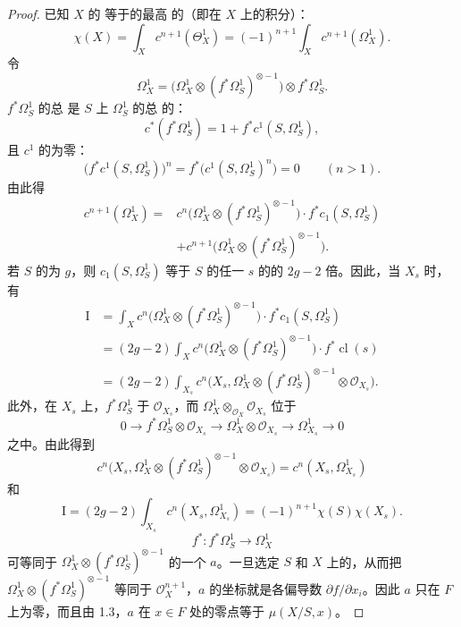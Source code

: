 \begin{proof}
已知 $X$ 的 等于的最高 的（即在 $X$ 上的积分）：
\[
\chi(X)=\int_X c^{n+1}(\Theta^1_X)
=(-1)^{n+1}\int_X c^{n+1}(\Omega^1_X).
\]
令
\[
\Omega^1_X=\bigl(\Omega^1_X\otimes(f^*\Omega^1_S)^{\otimes-1}\bigr)\otimes f^*\Omega^1_S.
\]
 $f^*\Omega^1_S$ 的总 是 $S$ 上 $\Omega^1_S$ 的总 的：
\[
c^*(f^*\Omega^1_S)=1+f^*c^1(S,\Omega^1_S),
\]
且 $c^1$ 的为零：
\[
\bigl(f^*c^1(S,\Omega^1_S)\bigr)^n
=f^*\bigl(c^1(S,\Omega^1_S)^n\bigr)=0\qquad(n>1).
\]
由此得
\[
\begin{aligned}
c^{n+1}(\Omega^1_X)
={}&c^n\bigl(\Omega^1_X\otimes(f^*\Omega^1_S)^{\otimes-1}\bigr)\cdot f^*c_1(S,\Omega^1_S)\\
&+c^{n+1}\bigl(\Omega^1_X\otimes(f^*\Omega^1_S)^{\otimes-1}\bigr).
\end{aligned}
\]
若 $S$ 的为 $g$，则 $c_1(S,\Omega^1_S)$ 等于 $S$ 的任一 $s$ 的的 $2g-2$ 倍。因此，当 $X_s$ 时，有
\[
\begin{aligned}
\mathrm I
&=\int_X c^n\bigl(\Omega^1_X\otimes(f^*\Omega^1_S)^{\otimes-1}\bigr)\cdot f^*c_1(S,\Omega^1_S)\\
&=(2g-2)\int_X c^n\bigl(\Omega^1_X\otimes(f^*\Omega^1_S)^{\otimes-1}\bigr)\cdot f^*\operatorname{cl}(s)\\
&=(2g-2)\int_{X_s}c^n\bigl(X_s,\Omega^1_X\otimes(f^*\Omega^1_S)^{\otimes-1}\otimes\mathscr O_{X_s}\bigr).
\end{aligned}
\]
此外，在 $X_s$ 上，$f^*\Omega^1_S$ 于 $\mathscr O_{X_s}$，而 $\Omega^1_X\otimes_{\mathscr O_X}\mathscr O_{X_s}$ 位于
\[
0\longrightarrow f^*\Omega^1_S\otimes\mathscr O_{X_s}
\longrightarrow\Omega^1_X\otimes\mathscr O_{X_s}
\longrightarrow\Omega^1_{X_s}\longrightarrow0
\]
之中。由此得到
\[
c^n\bigl(X_s,\Omega^1_X\otimes(f^*\Omega^1_S)^{\otimes-1}\otimes\mathscr O_{X_s}\bigr)
=c^n(X_s,\Omega^1_{X_s})
\]
和
\[
\mathrm I=(2g-2)\int_{X_s}c^n(X_s,\Omega^1_{X_s})
=(-1)^{n+1}\chi(S)\chi(X_s).
\]
\[
f^*:f^*\Omega^1_S\longrightarrow\Omega^1_X
\]
可等同于 $\Omega^1_X\otimes(f^*\Omega^1_S)^{\otimes-1}$ 的一个 $a$。一旦选定 $S$ 和 $X$ 上的，从而把 $\Omega^1_X\otimes(f^*\Omega^1_S)^{\otimes-1}$ 等同于 $\mathscr O_X^{n+1}$，$a$ 的坐标就是各偏导数 $\partial f/\partial x_i$。因此 $a$ 只在 $F$ 上为零，而且由 1.3，$a$ 在 $x\in F$ 处的零点等于  $\mu(X/S,x)$。


\end{proof}
